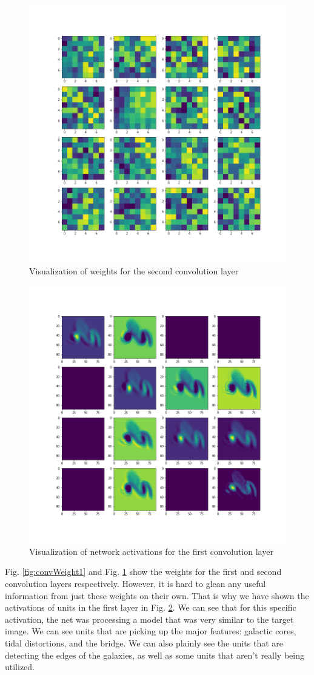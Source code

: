 \documentclass[conference]{IEEEtran}
\begin{document}
\begin{figure}[htbp]
\centerline{\includegraphics[width=0.75\linewidth]{./Images/convWeight2.png}}
\caption{Visualization of weights for the second convolution layer}
\label{fig:convWeight2}
\end{figure}

\begin{figure}[htbp]
\centerline{\includegraphics[width=0.75\linewidth]{./Images/layer1activations.png}}
\caption{Visualization of network activations for the first convolution layer}
\label{fig:layer1activations}
\end{figure}

Fig. \ref{fig:convWeight1} and Fig. \ref{fig:convWeight2} show the weights for the first and second convolution layers respectively. However, it is hard to glean any useful information from just these weights on their own. That is why we have shown the activations of units in the first layer in Fig. \ref{fig:layer1activations}. We can see that for this specific activation, the net was processing a model that was very similar to the target image. We can see units that are picking up the major features: galactic cores, tidal distortions, and the bridge. We can also plainly see the units that are detecting the edges of the galaxies, as well as some units that aren't really being utilized.
\end{document}
